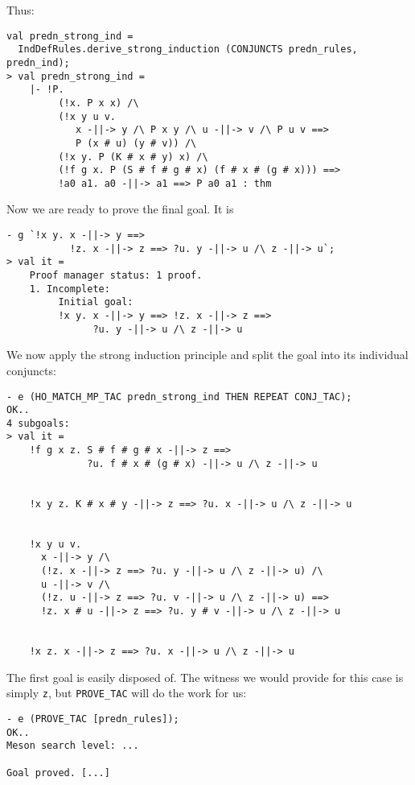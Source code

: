 Thus:
\begin{session}\begin{verbatim}
val predn_strong_ind =
  IndDefRules.derive_strong_induction (CONJUNCTS predn_rules, predn_ind);
> val predn_strong_ind =
    |- !P.
         (!x. P x x) /\
         (!x y u v.
            x -||-> y /\ P x y /\ u -||-> v /\ P u v ==>
            P (x # u) (y # v)) /\
         (!x y. P (K # x # y) x) /\
         (!f g x. P (S # f # g # x) (f # x # (g # x))) ==>
         !a0 a1. a0 -||-> a1 ==> P a0 a1 : thm
\end{verbatim}\end{session}
\eos{}

\noindent Now we are ready to prove the final goal.  It is
\begin{session}\begin{verbatim}
- g `!x y. x -||-> y ==>
           !z. x -||-> z ==> ?u. y -||-> u /\ z -||-> u`;
> val it =
    Proof manager status: 1 proof.
    1. Incomplete:
         Initial goal:
         !x y. x -||-> y ==> !z. x -||-> z ==>
               ?u. y -||-> u /\ z -||-> u
\end{verbatim}\end{session}
We now apply the strong induction principle and split the goal into
its individual conjuncts:
\begin{session}\begin{verbatim}
- e (HO_MATCH_MP_TAC predn_strong_ind THEN REPEAT CONJ_TAC);
OK..
4 subgoals:
> val it =
    !f g x z. S # f # g # x -||-> z ==>
              ?u. f # x # (g # x) -||-> u /\ z -||-> u


    !x y z. K # x # y -||-> z ==> ?u. x -||-> u /\ z -||-> u


    !x y u v.
      x -||-> y /\
      (!z. x -||-> z ==> ?u. y -||-> u /\ z -||-> u) /\
      u -||-> v /\
      (!z. u -||-> z ==> ?u. v -||-> u /\ z -||-> u) ==>
      !z. x # u -||-> z ==> ?u. y # v -||-> u /\ z -||-> u


    !x z. x -||-> z ==> ?u. x -||-> u /\ z -||-> u
\end{verbatim}\end{session}
The first goal is easily disposed of.  The witness we would provide
for this case is simply \texttt{z}, but \texttt{PROVE\_TAC} will do
the work for us:
\begin{session}\begin{verbatim}
- e (PROVE_TAC [predn_rules]);
OK..
Meson search level: ...

Goal proved. [...]
\end{verbatim}\end{session}
